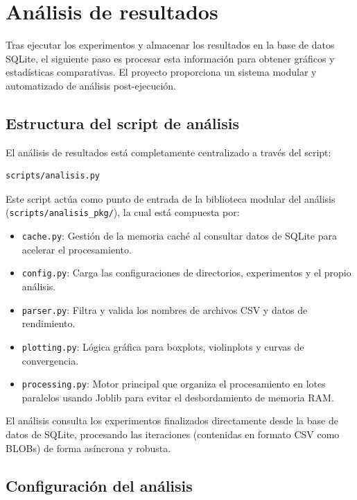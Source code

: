 \section{Análisis de resultados}
\label{sec:analisis}

Tras ejecutar los experimentos y almacenar los resultados en la base de datos SQLite, el siguiente paso es procesar esta información para obtener gráficos y estadísticas comparativas. El proyecto proporciona un sistema modular y automatizado de análisis post-ejecución.

\subsection{Estructura del script de análisis}

El análisis de resultados está completamente centralizado a través del script:
\begin{verbatim}
scripts/analisis.py
\end{verbatim}
Este script actúa como punto de entrada de la biblioteca modular del análisis (\texttt{scripts/analisis\_pkg/}), la cual está compuesta por:
\begin{itemize}
    \item \texttt{cache.py}: Gestión de la memoria caché al consultar datos de SQLite para acelerar el procesamiento.
    \item \texttt{config.py}: Carga las configuraciones de directorios, experimentos y el propio análisis.
    \item \texttt{parser.py}: Filtra y valida los nombres de archivos CSV y datos de rendimiento.
    \item \texttt{plotting.py}: Lógica gráfica para boxplots, violinplots y curvas de convergencia.
    \item \texttt{processing.py}: Motor principal que organiza el procesamiento en lotes paralelos usando Joblib para evitar el desbordamiento de memoria RAM.
\end{itemize}

El análisis consulta los experimentos finalizados directamente desde la base de datos de SQLite, procesando las iteraciones (contenidas en formato CSV como BLOBs) de forma asíncrona y robusta.

\subsection{Configuración del análisis}
\label{subsec:config_analisis_v2}

